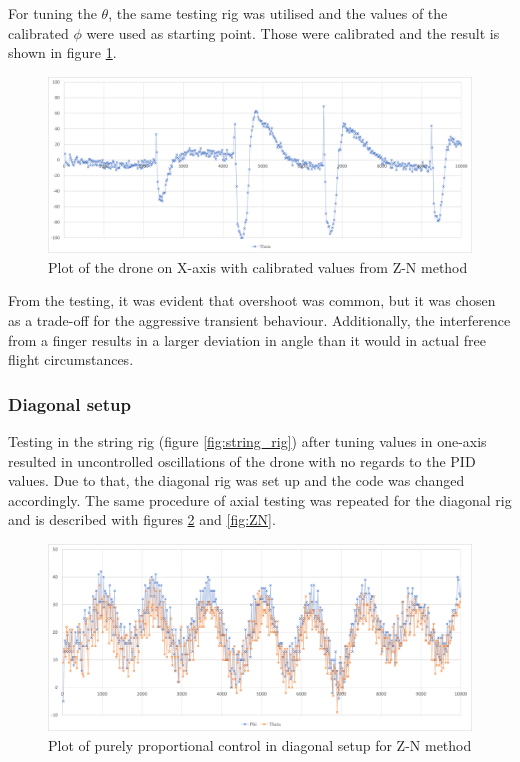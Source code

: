For tuning the $\theta$, the same testing rig was utilised and the values of the calibrated $\phi$ were used as starting point. Those were calibrated and the result is shown in figure \ref{fig:Theta_ZN}.

\begin{figure}[h!]
    \centering
    \includegraphics[width=\textwidth]{pictures/graphs/ThetaZN_00004.png}
    \caption{Plot of the drone on X-axis with calibrated values from Z-N method}
    \label{fig:Theta_ZN}
\end{figure}

From the testing, it was evident that overshoot was common, but it was chosen as a trade-off for the aggressive transient behaviour. Additionally, the interference from a finger results in a larger deviation in angle than it would in actual free flight circumstances.

\subsubsection{Diagonal setup}

Testing in the string rig (figure \ref{fig:string_rig}) after tuning values in one-axis resulted in uncontrolled oscillations of the drone with no regards to the PID values. Due to that, the diagonal rig was set up and the code was changed accordingly.
The same procedure of axial testing was repeated for the diagonal rig and is described with figures \ref{fig:diagonal} and \ref{fig:ZN}.

\begin{figure}[h!]
    \centering
    \includegraphics[width=\textwidth]{pictures/graphs/Diagonal_P0004.png}
    \caption{Plot of purely proportional control in diagonal setup for Z-N method}
    \label{fig:diagonal}
\end{figure}

